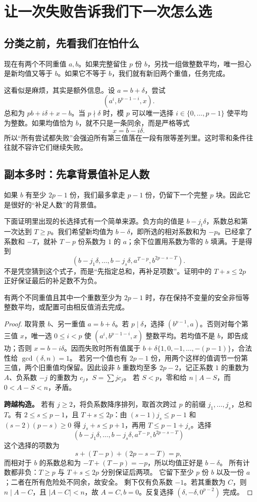 \chapter{让一次失败告诉我们下一次怎么选}\label{ch:descent-finish}
\section{分类之前，先看我们在怕什么}
现在有两个不同重值 $a,b$。如果完整留住 $p$ 份 $b$，另找一组做整数平均，唯一担心是新均值又等于 $b$。如果它不等于 $b$，我们就有新旧两个重值，任务完成。

这看似是麻烦，其实是额外信息。设 $a=b+\delta$，尝试
\[(a^i,b^{p-1-i},x).
\]
总和为 $pb+i\delta+x-b$。当 $p\nmid\delta$ 时，模 $p$ 可以唯一选择 $i\in\{0,\ldots,p-1\}$ 使平均为整数。如果均值恰为 $b$，就不只是一条同余，而是严格等式
\[x=b-i\delta.
\]
所以“所有尝试都失败”会强迫所有第三值落在一段有限等差列里。这时零和条件往往就不容许它们继续失败。

\section{副本多时：先拿背景值补足人数}
如果 $b$ 有至少 $2p-1$ 份，我们最多拿走 $p-1$ 份，仍留下一个完整 $p$ 块。因此它是很好的“补足人数”的背景值。

下面证明里出现的长选择式有一个简单来源。负方向的值是 $b-j_t\delta$，系数总和第一次达到 $T\ge p$。我们希望新均值为 $b-\delta$，即所选的相对系数和为 $-p$。已经拿了系数和 $-T$，就补 $T-p$ 份系数为 $1$ 的 $a$；余下位置用系数为零的 $b$ 填满。于是得到
\[(b-j_1\delta,\ldots,b-j_s\delta,a^{T-p},b^{2p-s-T}).
\]
不是凭空猜到这个式子，而是“先指定总和，再补足项数”。证明中的 $T+s\le2p$ 正好保证最后的补足数不为负。
\begin{lemma}[有充足背景副本时的续步]\label{lem:background}
有两个不同重值且其中一个重数至少为 $2p-1$ 时，存在保持不变量的安全非恒等整数平均，或配置可由相反值消去完成。
\end{lemma}
\begin{proof}
取背景 $b$、另一重值 $a=b+\delta$。若 $p\mid\delta$，选择 $(b^{p-1},a)$。否则对每个第三值 $x$，唯一选 $0\le i<p$ 使 $(a^i,b^{p-1-i},x)$ 整数平均。若均值不是 $b$，即告成功；否则 $x=b-i\delta$。因而失败时所有值属于 $b+\delta\{1,0,-1,\ldots,-(p-1)\}$，合法性给 $\gcd(\delta,n)=1$。
若另一个值也有 $2p-1$ 份，用两个这样的值调节一份第三值，两个旧重值均保留。因此设非 $b$ 重数均至多 $2p-2$，记正系数 $1$ 的重数为 $A$、负系数 $-j$ 的重数为 $c_j$，$S=\sum j c_j$。
若 $S<p$，零和给 $n\mid A-S$，而 $0<A-S<n$，矛盾。\par\noindent\textbf{跨越构造。}
若有 $j\ge2$，将负系数降序排列，取首次跨过 $p$ 的前缀 $j_1,\ldots,j_s$，总和 $T$。有 $2\le s\le p-1$，且 $T+s\le2p$：由 $(s-1)j_s\le p-1$ 和 $(s-2)(p-s)\ge0$ 得 $j_s+s\le p+1$，再用 $T\le p-1+j_s$。选择
\[(b-j_1\delta,\ldots,b-j_s\delta,a^{T-p},b^{2p-s-T})
\]
这个选择的项数为
\[
s+(T-p)+(2p-s-T)=p,
\]
而相对于 $b$ 的系数总和为 $-T+(T-p)=-p$，所以均值正好是 $b-\delta$。
所有计数都非负：$T\ge p$ 与 $T+s\le2p$ 分别保证后两项。
它留下至少 $p$ 份 $b$ 以及一份 $a$；二者在所有危险处不同余，故安全。
剩下仅有负系数 $-1$。若其重数为 $C$，则 $n\mid A-C$，且 $|A-C|<n$，故 $A=C,b=0$。反复选择 $(\delta,-\delta,0^{p-2})$ 完成。
\end{proof}

